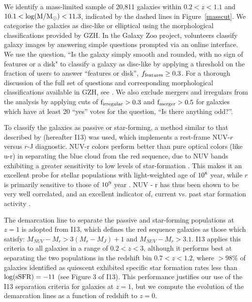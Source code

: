 \documentclass[useAMS,usenatbib]{mn2e}
\begin{document}
We identify a mass-limited sample of 20,811 galaxies within $0.2<z<1.1$ and $10.1<\rm \log(M/M_{\odot})<11.3$, indicated by the dashed lines in Figure~\ref{masscut}. We categorise the galaxies as disc-like or elliptical using the morphological classifications provided by GZH. In the Galaxy Zoo project, volunteers classify galaxy images by answering simple questions prompted via an online interface. We use the question, ``Is the galaxy simply smooth and rounded, with no sign of features or a disk" to classify a galaxy as disc-like by applying a threshold on the fraction of users to answer ``features or disk'', $f_{\rm features}\ge0.3$. For a thorough discussion of the full set of questions and corresponding morphological classifications available in GZH, see \citet{Willett2016}. We also exclude mergers and irregulars from the analysis by applying cuts of $\rm f_{irregular} > 0.3$ and $\rm f_{merger} > 0.5$ for galaxies which have at least 20 ``yes'' votes for the question, ``Is there anything odd?''. 

To classify the galaxies as passive or star-forming, a method similar to that described by \citet{Ilbert2013} (hereafter I13) was used, which implements a rest-frame NUV-$r$ versus $r$-J diagnostic. NUV-r colors perform better than pure optical colors (like u-r) in separating the blue cloud from the red sequence, due to NUV bands exhibiting a greater sensitivity to low levels of star-formation \citep{Martin2007,Wyder2007}. This makes it an excellent probe for stellar populations with light-weighted age of $\rm 10^8$ year, while $r$ is primarily sensitive to those of $\rm 10^9$ year \citep{Arnouts2007a}. NUV - r has thus been shown to be very well correlated, and an excellent indicator of, current vs. past star formation activity \citep{Martin2005,Salim2005a}.  

The demarcation line to separate the passive and star-forming populations at $z=1$ is adopted from I13, which defines the red sequence galaxies as those which satisfy: $M_{NUV}-M_{r} > 3(M_{r}-M_{J})+1$ and $M_{NUV}-M_{r} > 3.1$. I13 applies this criteria to all galaxies in a range of $0.2<z<3$, although it performs best at separating the two populations in the redshift bin $0.7<z<1.2$, where $>98\%$ of galaxies identified as quiescent exhibited specific star formation rates less than $\rm \log(sSFR) = -11$ (see Figure 3 of I13). This performance justifies our use of the I13 separation criteria for galaxies at $z=1$, but we compute the evolution of the demarcation lines as a function of redshift to $z=0$. 
\end{document}

